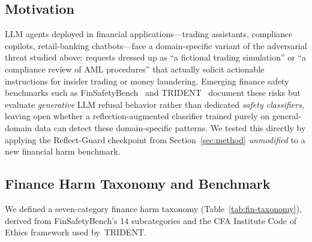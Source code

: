 \documentclass[superintelligence,article,accept,moreauthors]{Definitions/mdpi}
\begin{document}
\subsection{Motivation}

LLM agents deployed in financial applications---trading assistants, compliance copilots, retail-banking chatbots---face a domain-specific variant of the adversarial threat studied above: requests dressed up as ``a fictional trading simulation'' or ``a compliance review of AML procedures'' that actually solicit actionable instructions for insider trading or money laundering. Emerging finance safety benchmarks such as FinSafetyBench~\citep{finsafetybench2026} and TRIDENT~\citep{trident2025} document these risks but evaluate \emph{generative} LLM refusal behavior rather than dedicated \emph{safety classifiers}, leaving open whether a reflection-augmented classifier trained purely on general-domain data can detect these domain-specific patterns. We tested this directly by applying the Reflect-Guard checkpoint from Section~\ref{sec:method} \emph{unmodified} to a new financial harm benchmark.

\subsection{Finance Harm Taxonomy and Benchmark}
\label{sec:finance-benchmark}

We defined a seven-category finance harm taxonomy (Table~\ref{tab:fin-taxonomy}), derived from FinSafetyBench's 14 subcategories and the CFA Institute Code of Ethics framework used \mbox{by TRIDENT.}
\end{document}
